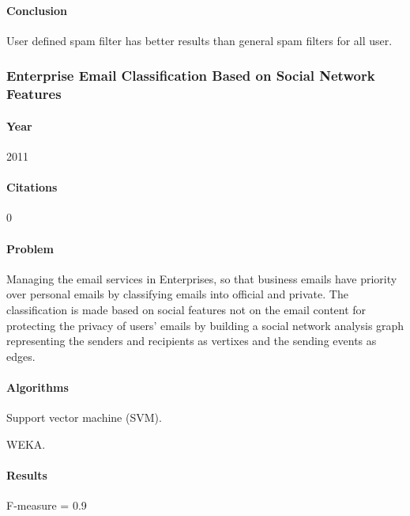 \documentclass[12pt]{article}
\newenvironment{my_itemize}
{\begin{itemize}
  \setlength{\itemsep}{0cm}
  \setlength{\parskip}{0cm}}
{\end{itemize}}
\begin{document}
\paragraph{Conclusion}
\begin{my_itemize}
  \item User defined spam filter has better results than general spam filters for all user.
\end{my_itemize}

\subsubsection{Enterprise Email Classification Based on Social Network Features \cite{MIN11}}

\paragraph{Year} 2011
\paragraph{Citations} 0

\paragraph{Problem}
Managing the email services in Enterprises, so that business emails have priority 
over personal emails by classifying emails into official and private. The 
classification is made based on social features not on the email content for 
protecting the privacy of users' emails by building a social network analysis 
graph representing the senders and recipients as vertixes and the sending events as edges.

\paragraph{Algorithms}
\begin{my_itemize}
  \item Support vector machine (SVM).
  \item WEKA.
\end{my_itemize}


\paragraph{Results}
\begin{my_itemize}
  \item F-measure = 0.9
\end{my_itemize}
\end{document}
